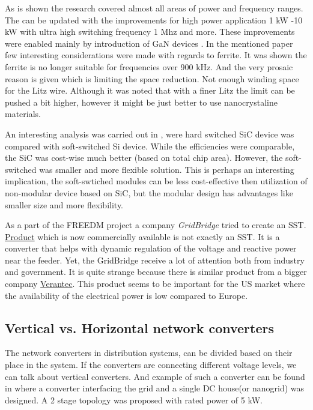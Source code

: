 \documentclass[]{scrartcl}
\begin{document}
As is shown the research covered almost all areas of power and frequency ranges. The \cite{Shen2006} can be updated with the improvements for high power application 1 kW -10 kW with ultra high switching frequency 1 Mhz and more. These improvements were enabled mainly by introduction of GaN devices \cite{Mu2014}. In the mentioned paper \cite{Mu2014} few interesting considerations were made  with regards to ferrite. It was shown the ferrite is no longer suitable for  frequencies over 900 kHz. And the very prosaic reason is given which is limiting the space reduction. Not enough winding space for  the Litz wire. Although it was noted that with a finer Litz the limit can be pushed a bit higher, however it might be just better to use nanocrystaline materials. 


An interesting analysis was carried out in \cite{Waffler2009}, were hard switched SiC device was compared with soft-switched Si device. While the efficiencies were comparable, the SiC was cost-wise much better (based on total chip area). However, the soft-switched was smaller and more flexible solution. This is perhaps an interesting implication, the soft-swtiched modules can be less cost-effective then utilization of non-modular device based on SiC, but the modular design has advantages like smaller size and more flexibility.

As a part of the FREEDM project a company \emph{GridBridge} tried to create an SST. \href{<http://www.grid-bridge.com/products-2/>}{Product} which is now commercially available is not exactly an SST. It is a converter that helps with dynamic regulation of the voltage and reactive power near the feeder. Yet, the GridBridge receive a lot of attention both from industry and government. It is quite strange because there is similar product from a bigger company \href{<http://varentec.com/products/engo-v10/>}{Verantec}. This product seems to be important for the US market where the availability of the electrical power is low compared to Europe.

\subsection{Vertical vs. Horizontal network converters}

The network converters in distribution systems, can be divided based on their place in the system. If the converters are connecting different voltage levels, we can talk about vertical converters. And example of such a converter can be found in \cite{Dong2013} where a converter interfacing the grid and a single DC house(or nanogrid) was designed. A 2 stage topology was proposed with rated power of 5 kW. 
\end{document}
